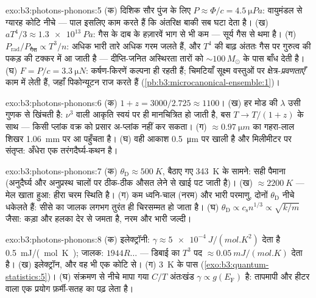 \begin{solution}{exo:b3:photons-phonons:5}
(क) दिशिक सौर पुंज के लिए $P \approx \Phi/c =
\qty{4.5}{\micro Pa}$: वायुमंडल से ग्यारह कोटि नीचे ---
पाल इसलिए काम करते हैं कि अंतरिक्ष बाकी सब घटा देता है। (ख)
$aT^4/3 \approx \qty{1.3e13}{Pa}$: गैस के दाब के हज़ारवें भाग से
भी कम --- सूर्य गैस से थमा है। (ग)
$P_{\text{rad}}/P_{\text{गैस}} \propto T^3/n$: अधिक भारी तारे
अधिक गरम जलते हैं, और $T^4$ की बाढ़ अंततः गैस पर गुरुत्व की पकड़ की
टक्कर में आ जाती है --- दीप्ति-जनित अस्थिरता तारों को
$\sim100\,M_\odot$ के पास बाँध देती है। (घ) $F = P/c = \qty{3.3}{\micro N}$:
कर्षण-किरणें कल्पना ही रहती हैं; चिमटियाँ सूक्ष्म वस्तुओं पर
क्षेत्र-\emph{प्रवणताएँ} काम में लेती हैं, जहाँ पिकोन्यूटन राज करते
हैं (\cref{pb:b3:microcanonical-ensemble:1})।
\end{solution}

\begin{solution}{exo:b3:photons-phonons:6}
(क) $1 + z = 3000/2.725 \approx 1100$। (ख) हर मोड की $\lambda$
उसी गुणक से खिंचती है: $\nu^3$ वाली आकृति स्वयं पर ही मानचित्रित
हो जाती है, बस $T \to T/(1+z)$ के साथ --- किसी प्लांक वक्र को
प्रसार अ-प्लांक नहीं कर सकता। (ग) $\approx\qty{0.97}{\micro m}$ का
गहरा-लाल शिखर \qty{1.06}{mm} पर आ पहुँचता है। (घ) वही आकाश
\qty{0.5}{\micro m} पर खाली है और मिलीमीटर पर संतृप्त: अँधेरा एक
तरंगदैर्घ्य-कथन है।
\end{solution}

\begin{solution}{exo:b3:photons-phonons:7}
(क) $\theta_{\text{D}} \approx \qty{500}{K}$, बैठाए गए
\qty{343}{K} के सामने: सही पैमाना (अनुदैर्घ्य और अनुप्रस्थ चालों पर
ठीक-ठीक औसत लेने से खाई पट जाती है)। (ख) $\approx\qty{2200}{K}$ ---
मेल खाता हुआ: हीरा चरम स्थिति है। (ग) कम ध्वनि-चाल (नरम)
और भारी परमाणु, दोनों $\theta_{\text{D}}$ नीचे धकेलते हैं: सीसे का
जालक लगभग तुरंत ही चिरसम्मत हो जाता है। (घ) $\theta_{\text{D}} \propto
c_{\text{s}}n^{1/3} \propto \sqrt{k/m}$ जैसा: कड़ा और हलका देर से
जमता है, नरम और भारी जल्दी।
\end{solution}

\begin{solution}{exo:b3:photons-phonons:8}
(क) इलेक्ट्रॉनी: $\gamma \approx \qty{5e-4}{J/(mol.K^2)}$ देता है
\qty{0.5}{mJ/(mol.K)}; जालक: $1944R\dots$ --- डिबाई का $T^3$
पद $\approx\qty{0.05}{mJ/(mol.K)}$ देता है। (ख) इलेक्ट्रॉन, और वह भी
एक कोटि से। (ग) \qty{3}{K} के पास
(\cref{exo:b3:quantum-statistics:5})। (घ) संक्रमण से नीचे मापा गया
$C/T$ अंतःखंड $\gamma \propto g(E_{\text{F}})$ है: तापमापी और
हीटर वाला एक प्रयोग फ़र्मी-सतह का 
पढ़ लेता है।
\end{solution}

